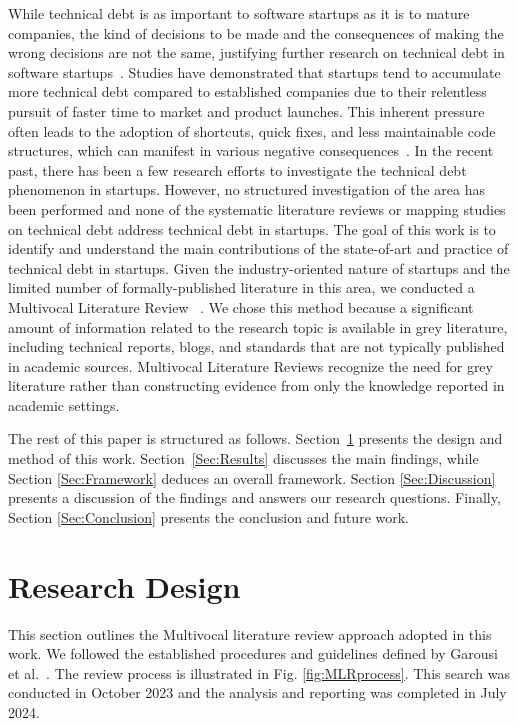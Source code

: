 While technical debt is as important to software startups as it is to mature companies, the kind of decisions to be made and the consequences of making the wrong decisions are not the same, justifying further research on technical debt in software startups~\cite{Unterkalmsteiner16}.
Studies have demonstrated that startups tend to accumulate more technical debt compared to established companies due to their relentless pursuit of faster time to market and product launches.
This inherent pressure often leads to the adoption of shortcuts, quick fixes, and less maintainable code structures, which can manifest in various negative consequences~\cite{Giardino2016,Klotins882019}.
In the recent past, there has been a few research efforts to investigate the technical debt phenomenon in startups.
However, no structured investigation of the area has been performed and none of the systematic literature reviews or mapping studies on technical debt address technical debt in startups.
The goal of this work is to identify and understand the main contributions of the state-of-art and practice of technical debt in startups.
Given the industry-oriented nature of startups and the limited number of formally-published literature in this area, we conducted a Multivocal Literature Review ~\cite{GAROUSI2019101}.
We chose this method because a significant amount of information related to the research topic is available in grey literature, including technical reports, blogs, and standards that are not typically published in academic sources.
Multivocal Literature Reviews recognize the need for grey literature rather than constructing evidence from only the knowledge reported in academic settings.

The rest of this paper is structured as follows.
Section~\ref{Sec:Research} presents the design and method of this work.
Section~\ref{Sec:Results} discusses the main findings, while Section \ref{Sec:Framework} deduces an overall framework. Section \ref{Sec:Discussion} presents a discussion of the findings and answers our research questions.
Finally, Section \ref{Sec:Conclusion} presents the conclusion and future work.

\section{Research Design}\label{Sec:Research}
This section outlines the Multivocal literature review approach adopted in this
work.
We followed the established procedures and guidelines defined by Garousi et al.~\cite{GAROUSI2019101}. The review process is illustrated in Fig. \ref{fig:MLRprocess}.
This search was conducted in October 2023 and the analysis and reporting was completed in July 2024.

